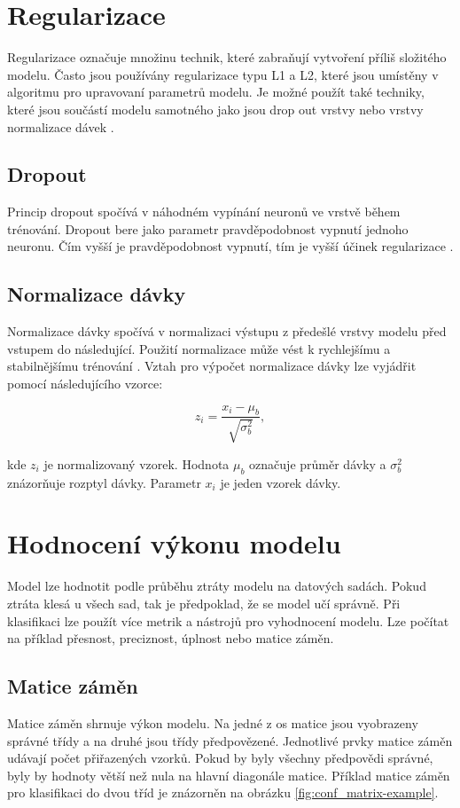 \documentclass[FM,BP]{tulthesis}
\begin{document}
\section{Regularizace} %
Regularizace označuje množinu technik, které zabraňují vytvoření příliš složitého modelu. Často jsou používány regularizace typu L1 a L2, které jsou umístěny v algoritmu pro upravovaní parametrů modelu. Je možné použít také techniky, které jsou součástí modelu samotného jako jsou drop out vrstvy nebo vrstvy normalizace dávek \cite{burkov2019hundred}.

\subsection{Dropout} %
Princip dropout spočívá v náhodném vypínání neuronů ve vrstvě během trénování. Dropout bere jako parametr pravděpodobnost vypnutí jednoho neuronu. Čím vyšší je pravděpodobnost vypnutí, tím je vyšší účinek regularizace \cite{burkov2019hundred}.

\subsection{Normalizace dávky} %
Normalizace dávky spočívá v normalizaci výstupu z předešlé vrstvy modelu před vstupem do následující. Použití normalizace může vést k rychlejšímu a stabilnějšímu trénování \cite{burkov2019hundred}. Vztah pro výpočet normalizace dávky lze vyjádřit pomocí následujícího vzorce:

\begin{equation}
\label{eqn:batch_mean}
z_i = \frac{x_i - \mu_b}{\sqrt{\sigma^2_b}},
\end{equation}

kde $ z_i $ je normalizovaný vzorek. Hodnota $ \mu_b $ označuje průměr dávky a $ \sigma^2_b $ znázorňuje rozptyl dávky. Parametr $ x_i $ je jeden vzorek dávky.

\section{Hodnocení výkonu modelu} %
Model lze hodnotit podle průběhu ztráty modelu na datových sadách. Pokud ztráta klesá u všech sad, tak je předpoklad, že se model učí správně. Při klasifikaci lze použít více metrik a nástrojů pro vyhodnocení modelu. Lze počítat na příklad přesnost, preciznost, úplnost nebo matice záměn.

\subsection{Matice záměn} %
Matice záměn shrnuje výkon modelu. Na jedné z os matice jsou vyobrazeny správné třídy a na druhé jsou třídy předpovězené. Jednotlivé prvky matice záměn udávají počet přiřazených vzorků. Pokud by byly všechny předpovědi správné, byly by hodnoty větší než nula na hlavní diagonále matice. Příklad matice záměn pro klasifikaci do dvou tříd je znázorněn na obrázku \ref{fig:conf_matrix-example}.
\end{document}
